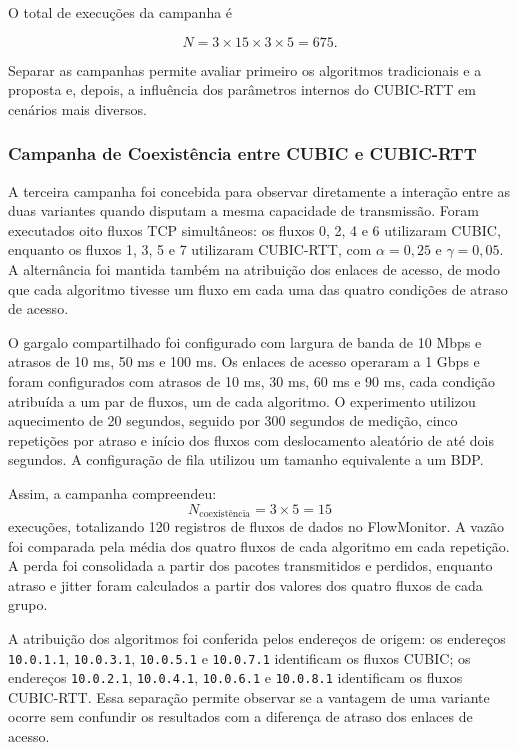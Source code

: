 \documentclass[a4paper,12pt]{monografia}
\begin{document}
O total de execuções da campanha é

\begin{equation}
N = 3 \times 15 \times 3 \times 5 = 675.
\end{equation}

Separar as campanhas permite avaliar primeiro os algoritmos tradicionais e a proposta e, depois, a influência dos parâmetros internos do CUBIC-RTT em cenários mais diversos.

\subsubsection{Campanha de Coexistência entre CUBIC e CUBIC-RTT}

A terceira campanha foi concebida para observar diretamente a interação entre as duas variantes quando disputam a mesma capacidade de transmissão. Foram executados oito fluxos TCP simultâneos: os fluxos 0, 2, 4 e 6 utilizaram CUBIC, enquanto os fluxos 1, 3, 5 e 7 utilizaram CUBIC-RTT, com $\alpha=0{,}25$ e $\gamma=0{,}05$. A alternância foi mantida também na atribuição dos enlaces de acesso, de modo que cada algoritmo tivesse um fluxo em cada uma das quatro condições de atraso de acesso.

O gargalo compartilhado foi configurado com largura de banda de 10 Mbps e atrasos de 10 ms, 50 ms e 100 ms. Os enlaces de acesso operaram a 1 Gbps e foram configurados com atrasos de 10 ms, 30 ms, 60 ms e 90 ms, cada condição atribuída a um par de fluxos, um de cada algoritmo. O experimento utilizou aquecimento de 20 segundos, seguido por 300 segundos de medição, cinco repetições por atraso e início dos fluxos com deslocamento aleatório de até dois segundos. A configuração de fila utilizou um tamanho equivalente a um BDP.

Assim, a campanha compreendeu:
\begin{equation}
N_{\text{coexistência}} = 3 \times 5 = 15
\end{equation}
execuções, totalizando 120 registros de fluxos de dados no FlowMonitor. A vazão foi comparada pela média dos quatro fluxos de cada algoritmo em cada repetição. A perda foi consolidada a partir dos pacotes transmitidos e perdidos, enquanto atraso e jitter foram calculados a partir dos valores dos quatro fluxos de cada grupo.

A atribuição dos algoritmos foi conferida pelos endereços de origem: os endereços \texttt{10.0.1.1}, \texttt{10.0.3.1}, \texttt{10.0.5.1} e \texttt{10.0.7.1} identificam os fluxos CUBIC; os endereços \texttt{10.0.2.1}, \texttt{10.0.4.1}, \texttt{10.0.6.1} e \texttt{10.0.8.1} identificam os fluxos CUBIC-RTT. Essa separação permite observar se a vantagem de uma variante ocorre sem confundir os resultados com a diferença de atraso dos enlaces de acesso.
\end{document}
